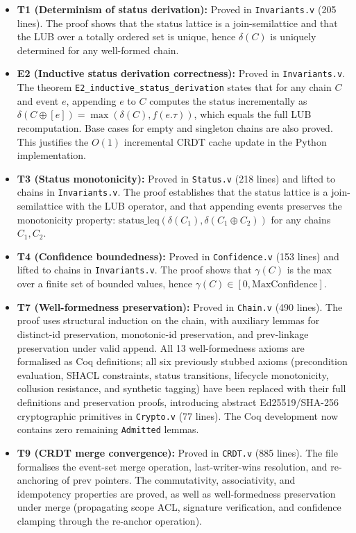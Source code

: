 \begin{itemize}[leftmargin=2em]
  \item \textbf{T1 (Determinism of status derivation):} Proved in \texttt{Invariants.v} (205 lines). The proof shows that the status lattice is a join-semilattice and that the LUB over a totally ordered set is unique, hence $\delta(C)$ is uniquely determined for any well-formed chain.
  \item \textbf{E2 (Inductive status derivation correctness):} Proved in \texttt{Invariants.v}. The theorem \texttt{E2\_inductive\_status\_derivation} states that for any chain $C$ and event $e$, appending $e$ to $C$ computes the status incrementally as $\delta(C \oplus [e]) = \max(\delta(C), f(e.\tau))$, which equals the full LUB recomputation. Base cases for empty and singleton chains are also proved. This justifies the $O(1)$ incremental CRDT cache update in the Python implementation.
  \item \textbf{T3 (Status monotonicity):} Proved in \texttt{Status.v} (218 lines) and lifted to chains in \texttt{Invariants.v}. The proof establishes that the status lattice is a join-semilattice with the LUB operator, and that appending events preserves the monotonicity property: $\text{status\_leq}(\delta(C_1), \delta(C_1 \oplus C_2))$ for any chains $C_1, C_2$.
  \item \textbf{T4 (Confidence boundedness):} Proved in \texttt{Confidence.v} (153 lines) and lifted to chains in \texttt{Invariants.v}. The proof shows that $\gamma(C)$ is the max over a finite set of bounded values, hence $\gamma(C) \in [0, \text{MaxConfidence}]$.
  \item \textbf{T7 (Well-formedness preservation):} Proved in \texttt{Chain.v} (490 lines). The proof uses structural induction on the chain, with auxiliary lemmas for distinct-id preservation, monotonic-id preservation, and prev-linkage preservation under valid append. All 13 well-formedness axioms are formalised as Coq definitions; all six previously stubbed axioms (precondition evaluation, SHACL constraints, status transitions, lifecycle monotonicity, collusion resistance, and synthetic tagging) have been replaced with their full definitions and preservation proofs, introducing abstract Ed25519/SHA-256 cryptographic primitives in \texttt{Crypto.v} (77 lines). The Coq development now contains zero remaining \texttt{Admitted} lemmas.
  \item \textbf{T9 (CRDT merge convergence):} Proved in \texttt{CRDT.v} (885 lines). The file formalises the event-set merge operation, last-writer-wins resolution, and re-anchoring of prev pointers. The commutativity, associativity, and idempotency properties are proved, as well as well-formedness preservation under merge (propagating scope ACL, signature verification, and confidence clamping through the re-anchor operation).
\end{itemize}

